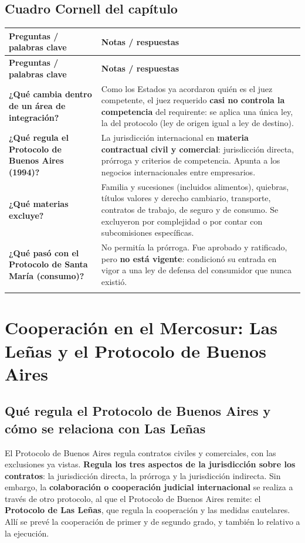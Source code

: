 \documentclass[12pt,oneside]{book}
\makeatletter
\newenvironment{cornell}{%
    \begin{longtable}{@{}>{\raggedright\arraybackslash}p{0.28\textwidth}>{\raggedright\arraybackslash}p{0.67\textwidth}@{}}
    \toprule
    \textbf{Preguntas / palabras clave} & \textbf{Notas / respuestas} \\
    \midrule
    \endfirsthead
    \toprule
    \textbf{Preguntas / palabras clave} & \textbf{Notas / respuestas} \\
    \midrule
    \endhead
}{%
    \end{longtable}
}
\newcommand{\cornellrow}[2]{\textbf{#1} & #2 \\[0.6em]}
\newcommand{\cornellresumen}[1]{%
    \midrule
    \multicolumn{2}{@{}p{\dimexpr0.95\textwidth+2\tabcolsep\relax}@{}}{\textbf{Resumen:} #1} \\
    \bottomrule
}
\makeatother
\begin{document}
\section{Cuadro Cornell del capítulo}

\begin{cornell}
\cornellrow{¿Qué cambia dentro de un área de integración?}{Como los Estados ya acordaron quién es el juez competente, el juez requerido \textbf{casi no controla la competencia} del requirente: se aplica una única ley, la del protocolo (ley de origen igual a ley de destino).}
\cornellrow{¿Qué regula el Protocolo de Buenos Aires (1994)?}{La jurisdicción internacional en \textbf{materia contractual civil y comercial}: jurisdicción directa, prórroga y criterios de competencia. Apunta a los negocios internacionales entre empresarios.}
\cornellrow{¿Qué materias excluye?}{Familia y sucesiones (incluidos alimentos), quiebras, títulos valores y derecho cambiario, transporte, contratos de trabajo, de seguro y de consumo. Se excluyeron por complejidad o por contar con subcomisiones específicas.}
\cornellrow{¿Qué pasó con el Protocolo de Santa María (consumo)?}{No permitía la prórroga. Fue aprobado y ratificado, pero \textbf{no está vigente}: condicionó su entrada en vigor a una ley de defensa del consumidor que nunca existió.}
\cornellresumen{Dentro de la integración el control se simplifica porque los Estados acordaron de antemano quién es el juez competente. El Protocolo de Buenos Aires (1994) lo hace para los contratos civiles y comerciales entre empresarios, con exclusiones como familia, quiebras, transporte, trabajo, seguros y consumo; el Protocolo de Santa María, sobre consumo, no está vigente.}
\end{cornell}

\chapter[Cooperación en el Mercosur: Las Leñas y Buenos Aires]{Cooperación en el Mercosur: Las Leñas y el Protocolo de Buenos Aires}

\section{Qué regula el Protocolo de Buenos Aires y cómo se relaciona con Las Leñas}

El Protocolo de Buenos Aires regula contratos civiles y comerciales, con las exclusiones ya vistas. \textbf{Regula los tres aspectos de la jurisdicción sobre los contratos}: la jurisdicción directa, la prórroga y la jurisdicción indirecta. Sin embargo, la \textbf{colaboración o cooperación judicial internacional} se realiza a través de otro protocolo, al que el Protocolo de Buenos Aires remite: el \textbf{Protocolo de Las Leñas}, que regula la cooperación y las medidas cautelares. Allí se prevé la cooperación de primer y de segundo grado, y también lo relativo a la ejecución.
\end{document}
